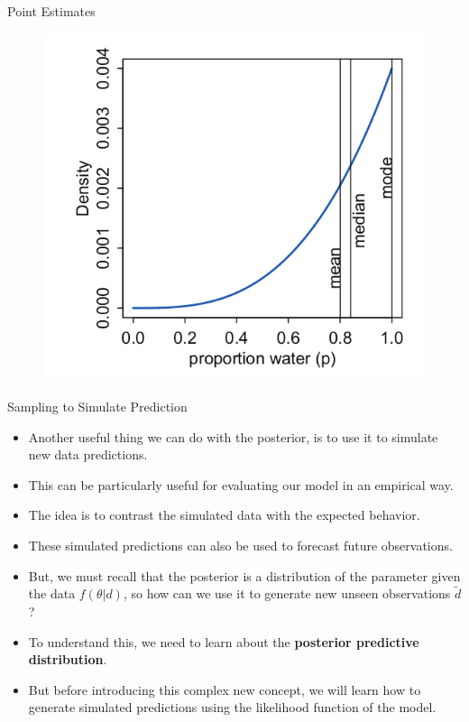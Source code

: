 \documentclass[handout]{beamer}
\begin{document}
\begin{frame}{Point Estimates}
\scriptsize{

   \begin{figure}[h!]
	\centering
	\includegraphics[scale=0.45]{pics/posterior_points.png}
	\end{figure} 




} 

\end{frame}


\begin{frame}{Sampling to Simulate Prediction}
\scriptsize{

\begin{itemize}
\item Another useful thing we can do with the posterior, is to use it to simulate new data predictions.

\item This can be particularly useful for evaluating our model in an empirical way.

\item The idea is to contrast the simulated data with the expected behavior.

\item These simulated predictions can also be used to forecast future observations.

\item But, we must recall that the posterior is a distribution of the parameter given the data $f(\theta|d)$, so how can we use it to generate new unseen observations $\tilde{d}$?

\item To understand this, we need to learn about the \textbf{posterior predictive distribution}.

\item But before introducing this complex new concept, we will learn how to generate simulated predictions using  the likelihood function of the model.

\end{itemize}


} 
\end{frame}
\end{document}
